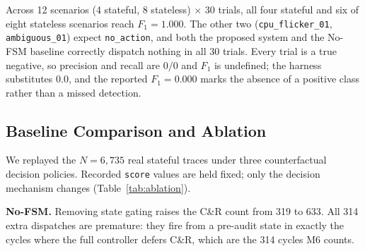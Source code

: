 \documentclass[conference]{IEEEtran}
\begin{document}
Across 12 scenarios (4 stateful, 8 stateless) $\times$ 30 trials, all four stateful and six of eight stateless scenarios reach $F_1 = 1.000$. The other two (\texttt{cpu\_flicker\_01}, \texttt{ambiguous\_01}) expect \texttt{no\_action}, and both the proposed system and the No-FSM baseline correctly dispatch nothing in all 30 trials. Every trial is a true negative, so precision and recall are $0/0$ and $F_1$ is undefined; the harness substitutes 0.0, and the reported $F_1 = 0.000$ marks the absence of a positive class rather than a missed detection.

\subsection{Baseline Comparison and Ablation}
\label{sec:ablation}

We replayed the $N = 6{,}735$ real stateful traces under three counterfactual decision policies. Recorded \texttt{score} values are held fixed; only the decision mechanism changes (Table~\ref{tab:ablation}).

\begin{table}[t]
\caption{Decision-policy ablation on $N = 6{,}735$ real Type~F traces. Unsafe C\&R: premature dispatch from a pre-audit state. Missed C\&R: suppressed by a memoryless or binary policy.}
\label{tab:ablation}
\centering
\renewcommand{\arraystretch}{1.15}
\end{table}

\textbf{No-FSM.} Removing state gating raises the C\&R count from 319 to 633. All 314 extra dispatches are premature: they fire from a pre-audit state in exactly the cycles where the full controller defers C\&R, which are the 314 cycles M6 counts.
\end{document}

